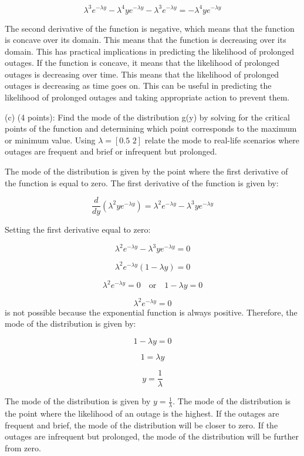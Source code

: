 \documentclass{article}
\begin{document}
\[\lambda^3e^{-\lambda y} - \lambda^4ye^{-\lambda y} - \lambda^3e^{-\lambda y} = -\lambda^4ye^{-\lambda y}\]

The second derivative of the function is negative, which means that the function is concave over its domain. This means that the function is decreasing over its domain. This has practical implications in predicting the likelihood of prolonged outages. If the function is concave, it means that the likelihood of prolonged outages is decreasing over time. This means that the likelihood of prolonged outages is decreasing as time goes on. This can be useful in predicting the likelihood of prolonged outages and taking appropriate action to prevent them.

(c) (4 points): Find the mode of the distribution g(y) by solving for the critical points of the
function and determining which point corresponds to the maximum or minimum value. Using \(\lambda = [\text{0.5 2}]\) relate the mode to real-life scenarios where outages are frequent and brief or infrequent but prolonged.\newline

The mode of the distribution is given by the point where the first derivative of the function is equal to zero. The first derivative of the function is given by:

\[\frac{d}{dy}(\lambda^2ye^{-\lambda y}) = \lambda^2e^{-\lambda y} - \lambda^3ye^{-\lambda y}\]

Setting the first derivative equal to zero:

\[\lambda^2e^{-\lambda y} - \lambda^3ye^{-\lambda y} = 0\]

\[\lambda^2e^{-\lambda y}(1 - \lambda y) = 0\]

\[\lambda^2e^{-\lambda y} = 0 \quad \text{or} \quad 1 - \lambda y = 0\]

\[\lambda^2e^{-\lambda y} = 0\] is not possible because the exponential function is always positive. Therefore, the mode of the distribution is given by:

\[1 - \lambda y = 0\]

\[1 = \lambda y\]

\[y = \frac{1}{\lambda}\]

The mode of the distribution is given by \(y = \frac{1}{\lambda}\). The mode of the distribution is the point where the likelihood of an outage is the highest. If the outages are frequent and brief, the mode of the distribution will be closer to zero. If the outages are infrequent but prolonged, the mode of the distribution will be further from zero.
\end{document}
